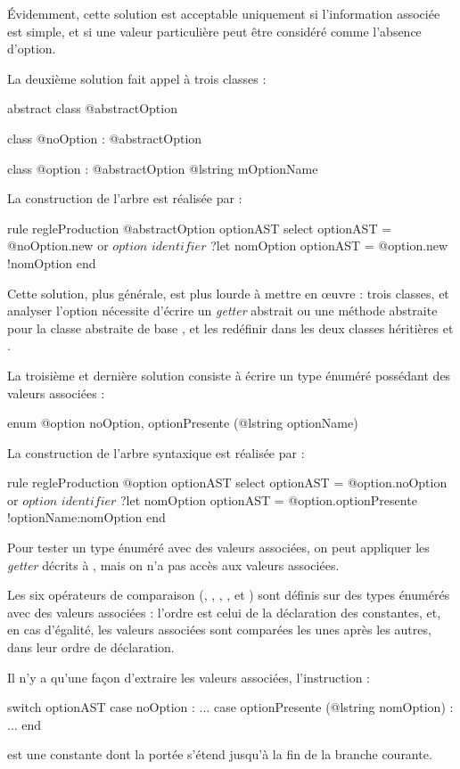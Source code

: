 Évidemment, cette solution est acceptable uniquement si l'information associée est simple, et si une valeur particulière peut être considéré comme l'absence d'option.

La deuxième solution fait appel à trois classes :
\begin{galgascode}
abstract class @abstractOption {}

class @noOption : @abstractOption {}

class @option : @abstractOption { @lstring mOptionName }
\end{galgascode}

La construction de l'arbre est réalisée par :
\begin{galgascode}
rule regleProduction {
  @abstractOption optionAST
  select
    optionAST = @noOption.new
  or
    $option$
    $identifier$ ?let nomOption
    optionAST = @option.new {!nomOption}
  end
}
\end{galgascode}

Cette solution, plus générale, est plus lourde à mettre en œuvre : trois classes, et analyser l'option nécessite d'écrire un \emph{getter} abstrait ou une méthode abstraite pour la classe abstraite de base , et les redéfinir dans les deux classes héritières  et .

La troisième et dernière solution consiste à écrire un type énuméré possédant des valeurs associées :

\begin{galgascode}
enum @option {
  noOption,
  optionPresente (@lstring optionName)
}
\end{galgascode}

La construction de l'arbre syntaxique est réalisée par :
\begin{galgascode}
rule regleProduction {
  @option optionAST
  select
    optionAST = @option.noOption
  or
    $option$
    $identifier$ ?let nomOption
    optionAST = @option.optionPresente {!optionName:nomOption}
  end
}
\end{galgascode}



Pour tester un type énuméré avec des valeurs associées, on peut appliquer les \emph{getter} décrits à , mais on n'a pas accès aux valeurs associées.

Les six opérateurs de comparaison (\galgas{==}, \galgas{\!=}, \galgas{<}, \galgas{<=}, \galgas{>} et \galgas{>}) sont définis sur des types énumérés avec des valeurs associées : l'ordre est celui de la déclaration des constantes, et, en cas d'égalité, les valeurs associées sont comparées les unes après les autres, dans leur ordre de déclaration.

Il n'y a qu'une façon d'extraire les valeurs associées, l'instruction  :

\begin{galgascode}
switch optionAST
case noOption : ...
case optionPresente (@lstring nomOption) : ...
end
\end{galgascode}

 est une constante dont la portée s'étend jusqu'à la fin de la branche  courante.
 
